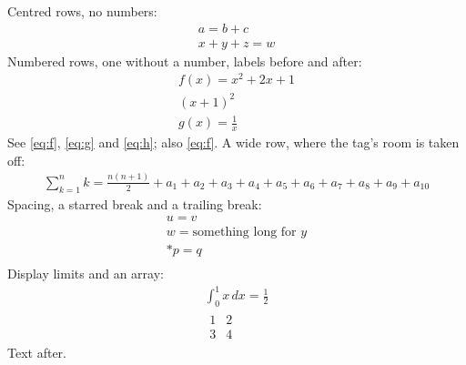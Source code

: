 \documentclass{article}
\begin{document}
Centred rows, no numbers:
\begin{gather*}
a = b + c \\
x + y + z = w
\end{gather*}
Numbered rows, one without a number, labels before and after:
\begin{gather}
f(x) = x^2 + 2x + 1 \label{eq:f} \\
(x+1)^2 \nonumber \\
g(x) = \frac{1}{x} \label{eq:g}
\end{gather}
See \eqref{eq:f}, \eqref{eq:g} and \eqref{eq:h}; also \ref{eq:f}.
A wide row, where the tag's room is taken off:
\begin{gather}
\sum_{k=1}^{n} k = \frac{n(n+1)}{2} + a_1 + a_2 + a_3 + a_4 + a_5 + a_6 + a_7 + a_8 + a_9 + a_{10} \label{eq:h}
\end{gather}
Spacing, a starred break and a trailing break:
\begin{gather}
u = v \\[2pt]
w = \text{something long for } y \\*
p = q \\
\end{gather}
Display limits and an array:
\begin{gather}
\int_0^1 x\,dx = \frac12 \\
\begin{array}{cc} 1 & 2 \\ 3 & 4 \end{array}
\end{gather}
Text after.
\end{document}
